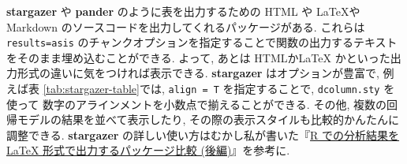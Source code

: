 \documentclass[
  xelatex,ja=standard,jafont=noto]{bxjsbook}
\newenvironment{Shaded}{\begin{snugshade}}{\end{snugshade}}
\newcommand{\AttributeTok}[1]{\textcolor[rgb]{0.77,0.63,0.00}{#1}}
\newcommand{\ControlFlowTok}[1]{\textcolor[rgb]{0.13,0.29,0.53}{\textbf{#1}}}
\newcommand{\FunctionTok}[1]{\textcolor[rgb]{0.00,0.00,0.00}{#1}}
\newcommand{\NormalTok}[1]{#1}
\newcommand{\SpecialCharTok}[1]{\textcolor[rgb]{0.00,0.00,0.00}{#1}}
\newcommand{\StringTok}[1]{\textcolor[rgb]{0.31,0.60,0.02}{#1}}
\theoremstyle{definition}
\theoremstyle{definition}
\theoremstyle{definition}
\theoremstyle{definition}
\theoremstyle{remark}
\begin{document}
\textbf{stargazer} や \textbf{pander} のように表を出力するための HTML や
\LaTeX や Markdown のソースコードを出力してくれるパッケージがある.
これらは \texttt{results=\textquotesingle{}asis\textquotesingle{}}
のチャンクオプションを指定することで関数の出力するテキストをそのまま埋め込むことができる.
よって, あとは HTMLか\LaTeX
かといった出力形式の違いに気をつければ表示できる. \textbf{stargazer}
はオプションが豊富で, 例えば表 \ref{tab:stargazer-table}では,
\texttt{align\ =\ T} を指定することで, \texttt{dcolumn.sty} を使って
数字のアラインメントを小数点で揃えることができる. その他,
複数の回帰モデルの結果を並べて表示したり,
その際の表示スタイルも比較的かんたんに調整できる. \textbf{stargazer}
の詳しい使い方はむかし私が書いた『\href{https://ill-identified.hatenablog.com/entry/2014/01/28/214814}{R
での分析結果を LaTeX 形式で出力するパッケージ比較 (後編)}』を参考に.



\begin{Shaded}
\end{Shaded}
\end{document}
